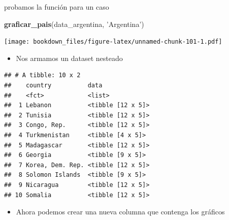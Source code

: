 \documentclass[]{book}
\newenvironment{Shaded}{\begin{snugshade}}{\end{snugshade}}
\newcommand{\DataTypeTok}[1]{\textcolor[rgb]{0.13,0.29,0.53}{#1}}
\newcommand{\DecValTok}[1]{\textcolor[rgb]{0.00,0.00,0.81}{#1}}
\newcommand{\KeywordTok}[1]{\textcolor[rgb]{0.13,0.29,0.53}{\textbf{#1}}}
\newcommand{\NormalTok}[1]{#1}
\newcommand{\OperatorTok}[1]{\textcolor[rgb]{0.81,0.36,0.00}{\textbf{#1}}}
\newcommand{\StringTok}[1]{\textcolor[rgb]{0.31,0.60,0.02}{#1}}
\providecommand{\tightlist}{%
  \setlength{\itemsep}{0pt}\setlength{\parskip}{0pt}}
\begin{document}
probamos la función para un caso

\begin{Shaded}
\begin{Highlighting}[]
\KeywordTok{graficar_pais}\NormalTok{(data_argentina, }\StringTok{'Argentina'}\NormalTok{)}
\end{Highlighting}
\end{Shaded}

\texttt{[image: bookdown\_files/figure-latex/unnamed-chunk-101-1.pdf]}

\begin{itemize}
\tightlist
\item
  Nos armamos un dataset nesteado
\end{itemize}

\begin{Shaded}
\end{Shaded}

\begin{verbatim}
## # A tibble: 10 x 2
##    country          data             
##    <fct>            <list>           
##  1 Lebanon          <tibble [12 x 5]>
##  2 Tunisia          <tibble [12 x 5]>
##  3 Congo, Rep.      <tibble [12 x 5]>
##  4 Turkmenistan     <tibble [4 x 5]> 
##  5 Madagascar       <tibble [12 x 5]>
##  6 Georgia          <tibble [9 x 5]> 
##  7 Korea, Dem. Rep. <tibble [12 x 5]>
##  8 Solomon Islands  <tibble [9 x 5]> 
##  9 Nicaragua        <tibble [12 x 5]>
## 10 Somalia          <tibble [12 x 5]>
\end{verbatim}

\begin{itemize}
\tightlist
\item
  Ahora podemos crear una nueva columna que contenga los gráficos
\end{itemize}

\begin{Shaded}
\end{Shaded}
\end{document}
